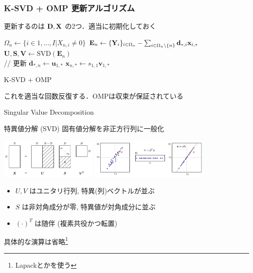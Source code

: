 \begin{frame}\frametitle{K-SVD + OMP 更新アルゴリズム}
更新するのは ${\mathbf{D}}, {\mathbf{X}}$ の2つ．適当に初期化しておく
\begin{algorithm}[H]
\begin{algorithmic}[1]
\STATE $\Omega_n \leftarrow \{ i \in {1, \dots, I} | X_{n, i} \neq 0 \}$
\STATE $\mathbf{E}_n \leftarrow \{{\mathbf{Y}}_i\}_{i \in \Omega_n} - \sum_{i \in \Omega_n \setminus \{n\}} \mathbf{d}_{*,i} \mathbf{x}_{i,*}$
\STATE $\mathbf{U, S, V} \leftarrow \mathrm{SVD}(\mathbf{E}_n)$ \\
// 更新
\STATE $\mathbf{d}_{*,n} \leftarrow \mathbf{u}_{1,*}$
\STATE $\mathbf{x}_{n,*} \leftarrow s_{1,1} \mathbf{v}_{1,*}$
\ENDFOR
\end{algorithmic}
\caption{K-SVD + OMP}
\label{alg:seq}
\end{algorithm}
これを適当な回数反復する．OMPは収束が保証されている
\end{frame}


\begin{frame}{Singular Value Decomposition}
\begin{block}{特異値分解 (SVD)}
固有値分解を非正方行列に一般化

\includegraphics[height=2cm]{figure/svd.png}
\includegraphics[height=2cm]{figure/svd1.png}

\begin{itemize}
    \item $U, V$ はユニタリ行列, 特異(列)ベクトルが並ぶ
    \item $S$ は非対角成分が零, 特異値が対角成分に並ぶ
    \item $(\cdot)^T$ は随伴 (複素共役かつ転置)
\end{itemize}
\end{block}
具体的な演算は省略\footnote{Lapackとかを使う}
\end{frame}




